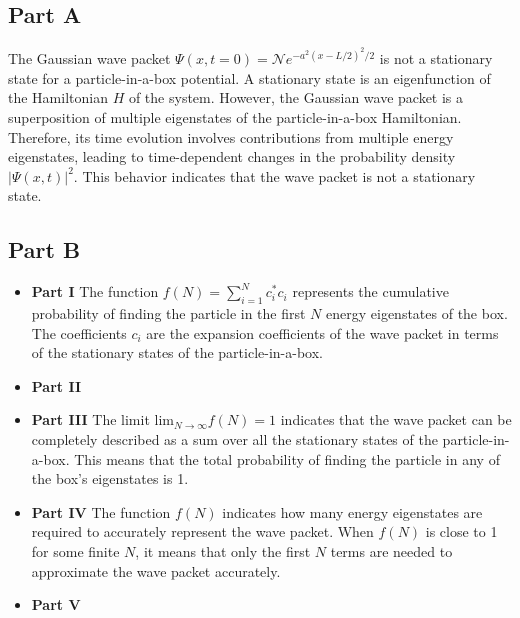 \documentclass{article}
\begin{document}
\begin{adjustwidth}{5pt}{5pt}

\subsection*{Part A}
The Gaussian wave packet $\Psi(x, t = 0) = \mathcal{N} e^{-a^2(x-L/2)^2/2}$ is not a stationary state for a particle-in-a-box potential. A stationary state is an eigenfunction of the Hamiltonian $H$ of the system. However, the Gaussian wave packet is a superposition of multiple eigenstates of the particle-in-a-box Hamiltonian. Therefore, its time evolution involves contributions from multiple energy eigenstates, leading to time-dependent changes in the probability density $|\Psi(x, t)|^2$. This behavior indicates that the wave packet is not a stationary state.

\subsection*{Part B}
\begin{itemize}
    \item[] \textbf{Part I} The function $f(N) = \sum_{i=1}^N c_i^{*} c_i$ represents the cumulative probability of finding the particle in the first $N$ energy eigenstates of the box. The coefficients $c_i$ are the expansion coefficients of the wave packet in terms of the stationary states of the particle-in-a-box.
    
    \vspace{0.2cm}
    \item[] \textbf{Part II}
    
    \vspace{0.2cm}
    \item[] \textbf{Part III} The limit $\mathrm{lim}_{N \rightarrow \infty} f(N) = 1$ indicates that the wave packet can be completely described as a sum over all the stationary states of the particle-in-a-box. This means that the total probability of finding the particle in any of the box's eigenstates is 1.
    
    \vspace{0.2cm}
    \item[] \textbf{Part IV} The function $f(N)$ indicates how many energy eigenstates are required to accurately represent the wave packet. When $f(N)$ is close to 1 for some finite $N$, it means that only the first $N$ terms are needed to approximate the wave packet accurately.
    
    \vspace{0.2cm}
    \item[] \textbf{Part V}
    

\end{itemize}
\end{adjustwidth}
\end{document}

